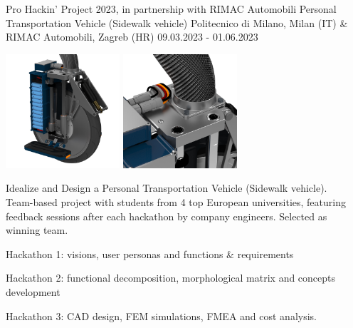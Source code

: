 \begin{cventries}
  \cventry
  {Pro Hackin' Project 2023, in partnership with RIMAC Automobili}
  {Personal Transportation Vehicle (Sidewalk vehicle)}
  {Politecnico di Milano, Milan (IT) \& RIMAC Automobili, Zagreb (HR)}
  {09.03.2023 - 01.06.2023}
  {
    \begin{minipage}{0.72\textwidth}
      \vspace{5pt}
      \begin{center}
        \includegraphics[height=120pt]{common/img/Rimac/1.jpg}
        \hspace{2cm}
        \includegraphics[height=120pt]{common/img/Rimac/2.jpg}
      \end{center}
      \vspace{5pt}
      Idealize and Design a Personal Transportation Vehicle (Sidewalk vehicle).\\
      Team-based project with students from 4 top European universities, featuring feedback sessions after each hackathon by company engineers. Selected as winning team.\\
      \begin{cvitems}
        \item {Hackathon 1: visions, user personas and functions \& requirements}
        \item {Hackathon 2: functional decomposition, morphological matrix and concepts development}
        \item {Hackathon 3: CAD design, FEM simulations, FMEA and cost analysis.}
      \end{cvitems}
      \vspace{4mm}
      \vspace{5pt}

\end{minipage}}
\end{cventries}
